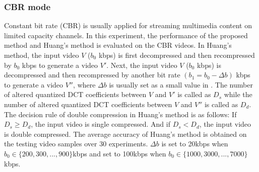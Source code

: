 \documentclass[journal,sort]{IEEEtran}
\begin{document}
\subsubsection{CBR mode \label{evaluation_mpeg2}}
Constant bit rate (CBR) is usually applied for streaming multimedia content on limited capacity channels. In this experiment, the performance of the proposed method and Huang's method \cite{huang2014detection} is evaluated on the CBR videos. In Huang's method, the input video $V$ ($b_0$ kbps) is first decompressed and then recompressed by $b_0$ kbps to generate a video $V'$. Next, the input video $V$ ($b_0$ kbps) is decompressed and then recompressed by another bit rate $(b_1 = b_0-\Delta b)$ kbps to generate a video $V''$, where $\Delta b$ is usually set as a small value in \cite{huang2014detection}. The number of altered quantized DCT coefficients between $V$ and $V'$ is called as $D_s$ while the number of altered quantized DCT coefficients between $V$ and $V''$ is called as $D_d$. The decision rule of double compression in Huang's method is as follows: If $D_s \geq D_d$, the input video is single compressed. And if $D_s < D_d$, the input video is double compressed. The average accuracy of Huang's method is obtained on the testing video samples over 30 experiments. $\Delta b$ is set to 20kbps when $b_0\in\{200,300,...,900\}$kbps and set to 100kbps when $b_0\in\{1000,3000,...,7000\}$kbps.
\end{document}
